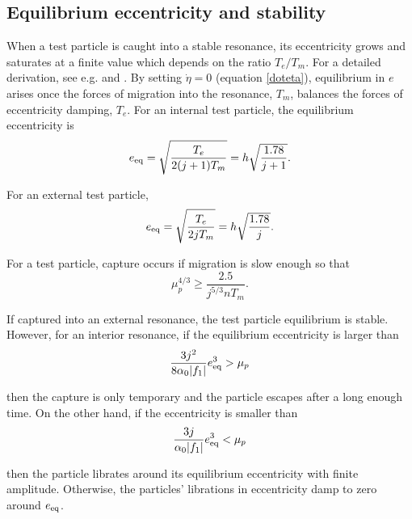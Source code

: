 \documentclass[usenatbib,twocolumn]{mnras}
\DeclarePairedDelimiter{\abs}{|}{|}
\begin{document}
\subsection{Equilibrium eccentricity and stability}
\label{sec:orgbc3e2f7}
When a test particle is caught into a stable resonance, its
eccentricity grows and saturates at a finite value which depends on
the ratio \(T_{e}/T_{m}\).  For a detailed derivation, see e.g.
\citep{goldreich_overstable_2014} and \citep{xu_migration_2018}.
By setting \(\dot\eta=0\) (equation \ref{doteta}), equilibrium
in \(e\) arises once the forces of migration into the resonance, \(T_m\), balances
the forces of eccentricity damping, \(T_e\). For an internal
test particle, the equilibrium eccentricity is
\begin{equation}
\label{eq:eeqint}
  e_{\rm eq} = \sqrt{\frac{T_e}{2(j+1)T_m}} = h\sqrt{\frac{1.78}{j+1}}.
\end{equation}

\noindent
For an external test particle,
\begin{equation}
\label{eq:eeqext}
  e_{\rm eq} = \sqrt{\frac{T_e}{2jT_m}} = h\sqrt{\frac{1.78}{j}}.
\end{equation}

For a test particle, capture occurs if migration is slow enough so that
\citep{goldreich_overstable_2014}
\begin{equation}
\mu_p^{4/3} \geq \frac{2.5}{j^{5/3}n T_m}.
\end{equation}

\noindent
If captured into an external resonance, the test particle equilibrium
is stable. However, for an interior resonance, if the equilibrium
eccentricity is larger than
\begin{equation}
  \frac{3j^2}{8\alpha_0 \abs{f_1}}e_{\rm eq}^3 > \mu_p
\end{equation}

\noindent
then the capture is only temporary and the particle escapes after a
long enough time. On the other hand, if the eccentricity is smaller
than
\begin{equation}
  \frac{3j}{\alpha_0 \abs{f_1}}e_{\rm eq}^3 < \mu_p
\end{equation}

\noindent
then the particle librates around its equilibrium eccentricity with
finite amplitude. Otherwise, the particles' librations in eccentricity
damp to zero around \(e_{\rm eq}\).

\end{document}
